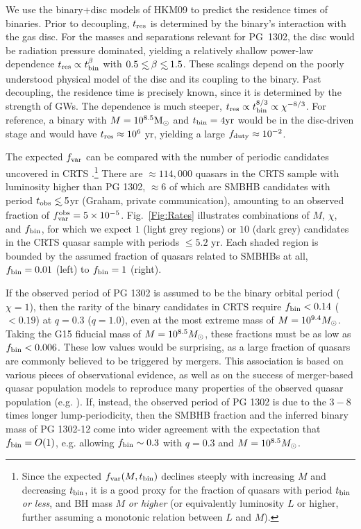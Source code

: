 We use the binary+disc models of HKM09 to predict the residence times
of binaries.  Prior to decoupling, $t_{\rm res}$ is determined by the
binary's interaction with the gas disc. For the masses and separations
relevant for PG~1302, the disc would be radiation pressure dominated,
yielding a relatively shallow power-law dependence $t_{\rm res}\propto
t_{\rm{bin}}^{\beta}$ with $0.5\lsim\beta\lsim 1.5$.  These scalings
depend on the poorly understood physical model of the disc and its
coupling to the binary. Past decoupling, the residence time is
precisely known, since it is determined by the strength of GWs. The
dependence is much steeper, $t_{\rm{res}}\propto t_{\rm{bin}}^{8/3}\propto
\chi^{-8/3}$.  For reference, a binary with $M=10^{8.5}{\rm M_\odot}$
and $t_{\rm bin}=4{\rm yr}$ would be in the disc-driven stage and
would have $t_{\rm res}\approx 10^6$ yr, yielding a large $f_{\rm
  duty}\approx 10^{-2}$.

The expected $f_{\rm var}$ can be compared with the number of periodic
candidates uncovered in CRTS \citep{CRTS1:Drake:2009,
  CRTS4:Djorgovski:2011, CRTS3:2011Mahabal}.\footnote{Since the
  expected $f_{\rm var}(M,t_{\rm bin})$ declines steeply with
  increasing $M$ and decreasing $t_{\rm bin}$, it is a good proxy for
  the fraction of quasars with period $t_{\rm bin}$ {\em or less}, and
  BH mass $M$ {\em or higher} (or equivalently luminosity $L$ or
  higher, further assuming a monotonic relation between $L$ and $M$).}
There are $\approx114,000$ quasars in the CRTS sample with luminosity
higher than PG 1302, $\approx 6$ of which are SMBHB candidates with
period $t_{\rm obs}\lsim 5$yr (Graham, private communication),
amounting to an observed fraction of $f_{\rm{var}}^{\rm
  obs}=5\times10^{-5}$. Fig.~\ref{Fig:Rates} illustrates combinations
of $M$, $\chi$, and $f_{\rm bin}$, for which we expect $1$ (light grey
regions) or $10$ (dark grey) candidates in the CRTS quasar sample with
periods $\leq5.2$ yr.  Each shaded region is bounded by the assumed
fraction of quasars related to SMBHBs at all, $f_{\rm{bin}}=0.01$ (left)
to $f_{\rm{bin}}=1$ (right).
 

If the observed period of PG 1302 is assumed to be the binary orbital
period ($\chi=1$), then the rarity of the binary candidates in CRTS
require $f_{\rm{bin}} < 0.14$ ($<0.19$) at $q=0.3$ ($q=1.0$), even at the
most extreme mass of $M=10^{9.4} {{M_{\odot}}}$. Taking the G15 fiducial
mass of $M=10^{8.5} {{M_{\odot}}}$, these fractions must be as low as 
$f_{\rm{bin}} < 0.006$. These low values would be surprising, as a large fraction of quasars
are commonly believed to be triggered by mergers. This association is
based on various pieces of observational evidence, as well as on the
success of merger-based quasar population models to reproduce many
properties of the observed quasar population (e.g. \citealt{KH2000}).
If, instead, the observed period of PG 1302 is due to the $3-8$ times
longer lump-periodicity, then the SMBHB fraction and the inferred
binary mass of PG 1302-12 come into wider agreement with the
expectation that $f_{\rm bin}=O(1)$, e.g. allowing $f_{\rm{bin}} \sim 0.3$
with $q=0.3$ and $M=10^{8.5} {{M_{\odot}}}$.


